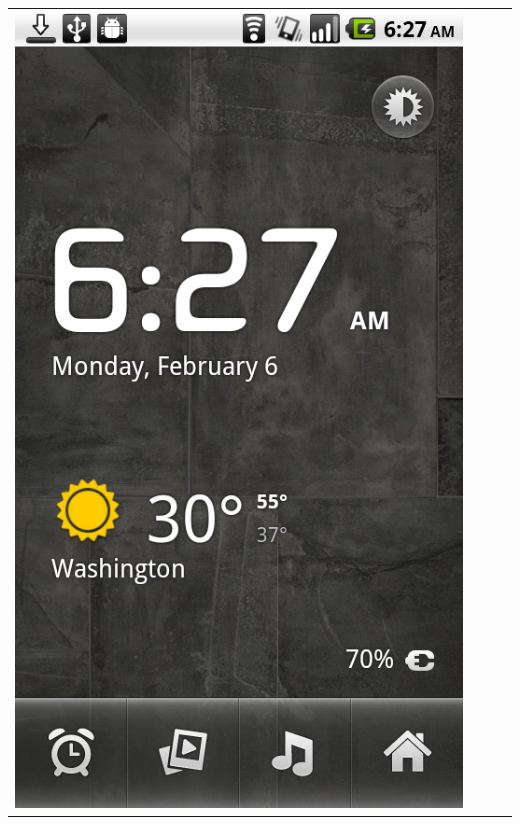 \documentclass[a4paper,10pt]{article}
\begin{document}
\begin{tabular}{ c c c c }
\includegraphics[scale=0.2,keepaspectratio=true]{client_download_notification.png}

\end{tabular}
\end{document}
